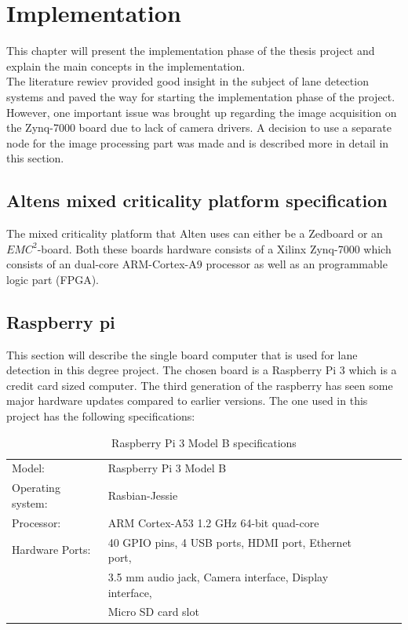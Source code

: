 \chapter{Implementation}
This chapter will present the implementation phase of the thesis project and explain the main concepts in the implementation.\\

The literature rewiev provided good insight in the subject of lane detection systems and paved the way for starting the implementation phase of the project. However, one important issue was brought up  regarding the image acquisition on the Zynq-7000 board due to lack of camera drivers. A decision to use a separate node for the image processing part was made and is described more in detail in this section.
\section{Altens mixed criticality platform specification}
The mixed criticality platform that Alten uses can either be a Zedboard or an $EMC^2$-board. Both these boards hardware consists of a Xilinx Zynq-7000 which consists of an dual-core ARM-Cortex-A9 processor as well as an programmable logic part (FPGA). 
\section{Raspberry pi}
This section will describe the single board computer that is used for lane detection in this degree project. The chosen board is a Raspberry Pi 3 which is a credit card sized computer. The third generation of the raspberry has seen some major hardware updates compared to earlier versions. The one used in this project has the following specifications:


\begin{table}[H]
\centering
\caption{Raspberry Pi 3 Model B specifications}
\label{my-label}
\begin{tabular}{lllll}
 Model:	&Raspberry Pi 3 Model B  \\
 Operating system:	&Rasbian-Jessie  \\
 Processor:	&ARM Cortex-A53 1.2 GHz 64-bit quad-core  \\
 Hardware Ports:	&40 GPIO pins, 4 USB ports, HDMI port, Ethernet port,\\  &3.5 mm audio jack, Camera interface, Display interface,\\  &Micro SD card slot
\end{tabular}
\end{table}


